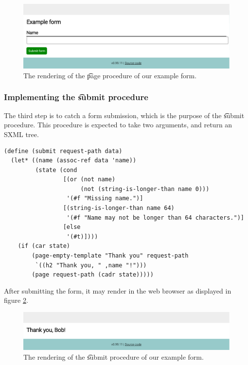   \begin{figure}[H]
    \begin{center}
      \includegraphics[width=1.0\textwidth]{figures/sg-web-form-example.pdf}
    \end{center}
    \caption{The rendering of the \t{page} procedure of our example form.}
    \label{fig:web-form-example}
  \end{figure}

\subsubsection{Implementing the \t{submit} procedure}

  The third step is to catch a form submission, which is the purpose of the
  \t{submit} procedure.  This procedure is expected to take two arguments,
  and return an SXML tree.

\begin{siderules}
\begin{verbatim}
(define (submit request-path data)
  (let* ((name (assoc-ref data 'name))
         (state (cond
                 [(or (not name)
                      (not (string-is-longer-than name 0)))
                  '(#f "Missing name.")]
                 [(string-is-longer-than name 64)
                  '(#f "Name may not be longer than 64 characters.")]
                 [else
                  '(#t)])))
    (if (car state)
        (page-empty-template "Thank you" request-path
         `((h2 "Thank you, " ,name "!")))
        (page request-path (cadr state)))))
\end{verbatim}
\end{siderules}

  After submitting the form, it may render in the web browser as displayed
  in figure \ref{fig:web-form-submit}.

  \begin{figure}[H]
    \begin{center}
      \includegraphics[width=1.0\textwidth]{figures/sg-web-form-example-submit.pdf}
    \end{center}
    \caption{The rendering of the \t{submit} procedure of our example form.}
    \label{fig:web-form-submit}
  \end{figure}


